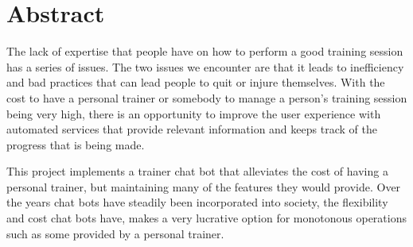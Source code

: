 \chapter*{Abstract}

The lack of expertise that people have on how to perform a good training session has a series of issues. The two issues we encounter are that it leads to inefficiency and bad practices that can lead people to quit or injure themselves. With the cost to have a personal trainer or somebody to manage a person’s training session being very high, there is an opportunity to improve the user experience with automated services that provide relevant information and keeps track of the progress that is being made.

This project implements a trainer chat bot that alleviates the cost of having a personal trainer, but maintaining many of the features they would provide. Over the years chat bots have steadily been incorporated into society, the flexibility and cost chat bots have, makes a very lucrative option for monotonous operations such as some provided by a personal trainer.





